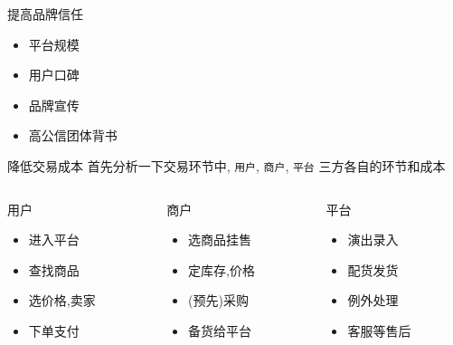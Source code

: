 \documentclass[presentation,bigger]{beamer}
\begin{document}
\begin{frame}[label={sec:org875d55f}]{提高品牌信任}
\begin{itemize}
\item 平台规模
\item 用户口碑
\item 品牌宣传
\item 高公信团体背书
\end{itemize}
\end{frame}

\begin{frame}{降低交易成本}
 首先分析一下交易环节中, \texttt{用户}, \texttt{商户}, \texttt{平台}  三方各自的环节和成本

\begin{columns}
\begin{column}{0.3\columnwidth}
\begin{exampleblock}{用户}
\begin{itemize}
\item 进入平台
\item 查找商品
\item 选价格,卖家
\item 下单支付
\end{itemize}
\end{exampleblock}
\end{column}

\begin{column}{0.3\columnwidth}
\begin{exampleblock}{商户}
\begin{itemize}
\item 选商品挂售
\item 定库存,价格
\item (预先)采购
\item 备货给平台
\end{itemize}
\end{exampleblock}
\end{column}

\begin{column}{0.3\columnwidth}
\begin{exampleblock}{平台}
\begin{itemize}
\item 演出录入
\item 配货发货
\item 例外处理
\item 客服等售后
\end{itemize}
\end{exampleblock}
\end{column}
\end{columns}


\end{frame}
\end{document}

